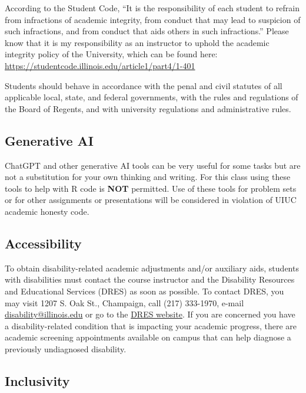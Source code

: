 \documentclass[11pt,letterpaper]{article}
\begin{document}
According to the Student Code, ``It is the responsibility of each student to refrain from infractions of academic integrity, from conduct that may lead to suspicion of such infractions, and from conduct that aids others in such infractions.'' Please know that it is my responsibility as an instructor to uphold the academic integrity policy of the University, which can be found here: \href{https://studentcode.illinois.edu/article1/part4/1-401}{https://studentcode.illinois.edu/article1/part4/1-401}

Students should behave in accordance with the penal and civil statutes of all applicable local, state, and federal governments, with the rules and regulations of the Board of Regents, and with university regulations and administrative rules.

\subsection*{Generative AI}

ChatGPT and other generative AI tools can be very useful for some tasks but are not a substitution for your own thinking and writing. For this class using these tools to help with R code is \textbf{NOT} permitted. Use of these tools for problem sets or for other assignments or presentations will be considered in violation of UIUC academic honesty code.

\subsection*{Accessibility}

To obtain disability-related academic adjustments and/or auxiliary aids, students with disabilities must contact the course instructor and the Disability Resources and Educational Services (DRES) as soon as possible. To contact DRES, you may visit 1207 S. Oak St., Champaign, call (217) 333-1970, e-mail \href{mailto:disability@illinois.edu}{disability@illinois.edu} or go to the \href{https://www.disability.illinois.edu/}{DRES website}. If you are concerned you have a disability-related condition that is impacting your academic progress, there are academic screening appointments available on campus that can help diagnose a previously undiagnosed disability.

\subsection*{Inclusivity}
\end{document}
